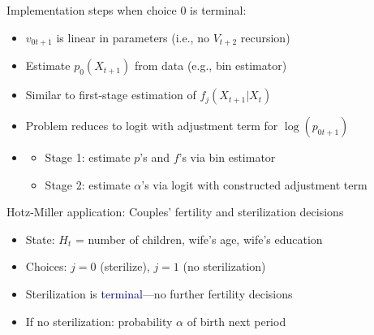 \documentclass[aspectratio=169]{beamer}
\begin{document}
\begin{frame}

Implementation steps when choice 0 is terminal:
\bigskip\par

\begin{itemize}
\itemsep1.5em
\item<1-> $v_{0t+1}$ is linear in parameters (i.e., no $V_{t+2}$ recursion)
\item<2-> Estimate $p_0(X_{t+1})$ from data (e.g., bin estimator)
\item<3-> Similar to first-stage estimation of $f_j(X_{t+1}|X_t)$
\item<4-> Problem reduces to logit with adjustment term for $\log(p_{0t+1})$
\item<4->[]
\begin{itemize}
\itemsep1.5em
    \item<5-> Stage 1: estimate $p$'s and $f$'s via bin estimator
    \item<6-> Stage 2: estimate $\alpha$'s via logit with constructed adjustment term
\end{itemize}
\end{itemize}
\end{frame}


\begin{frame}

Hotz-Miller application: Couples' fertility and sterilization decisions
\bigskip\par

\begin{itemize}
\itemsep1.5em
\item<2-> State: $H_t$ = number of children, wife's age, wife's education
\item<3-> Choices: $j=0$ (sterilize), $j=1$ (no sterilization)
\item<4-> Sterilization is \textcolor{navy}{terminal}---no further fertility decisions
\item<5-> If no sterilization: probability $\alpha$ of birth next period
\end{itemize}


\end{frame}
\end{document}
